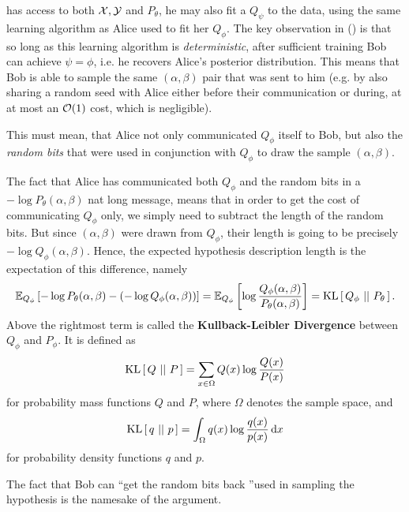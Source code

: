 has access to both $\X, \Y$ and $P_\theta$, he may also fit a $Q_\psi$ to the
data, using the same learning algorithm as Alice used to fit her $Q_\phi$. The
key observation in (\cite{hinton1993keeping}) is that so long as this learning
algorithm is \textit{deterministic}, after sufficient training Bob can achieve
$\psi = \phi$, i.e. he recovers Alice's posterior distribution. This means that
Bob is able to sample the same $(\alpha, \beta)$ pair that was sent to him (e.g.
by also sharing a random seed with Alice either before their communication or
during, at at most an $\Oh(1)$ cost, which is negligible).
\begin{framed}
This must mean, that
Alice not only communicated $Q_\phi$ itself to Bob, but also the \textit{random
  bits} that were used in conjunction with $Q_\phi$ to draw the sample $(\alpha,
\beta)$.
\end{framed}
The fact that Alice has communicated both $Q_\phi$ and the random bits in a $-\log
P_\theta(\alpha, \beta)$ nat long message, means that in order to get the cost
of communicating $Q_\phi$ only, we simply need to subtract the length of the
random bits. But since $(\alpha, \beta)$ were drawn from $Q_\phi$, their length
is going to be precisely $-\log Q_\phi(\alpha, \beta)$. Hence, the expected
hypothesis description length is the expectation of this difference, namely
\[
  \Exp{-\log P_\theta (\alpha, \beta) - (-\log Q_\phi(\alpha, \beta))}{Q_\phi}
  =  \Exp{\log \frac{Q_\phi(\alpha, \beta)}{P_\theta (\alpha, \beta)}}{Q_\phi}
  = \KL{Q_\phi}{P_\theta}.
\]
Above the rightmost term is called the \textbf{Kullback-Leibler Divergence}
between $Q_\phi$ and $P_\phi$. It is defined as
\[
  \KL{Q}{P} = \sum_{x \in \Omega} Q(x)\log\frac{Q(x)}{P(x)}
\]
for probability mass functions $Q$ and $P$, where $\Omega$ denotes the sample
space, and
\[
  \KL{q}{p} = \int_\Omega q(x) \log\frac{q(x)}{p(x)} \d x
\]
for probability density functions $q$ and $p$.
\par
The fact that Bob can ``get the random bits back ''used in sampling the
hypothesis is the namesake of the argument.

